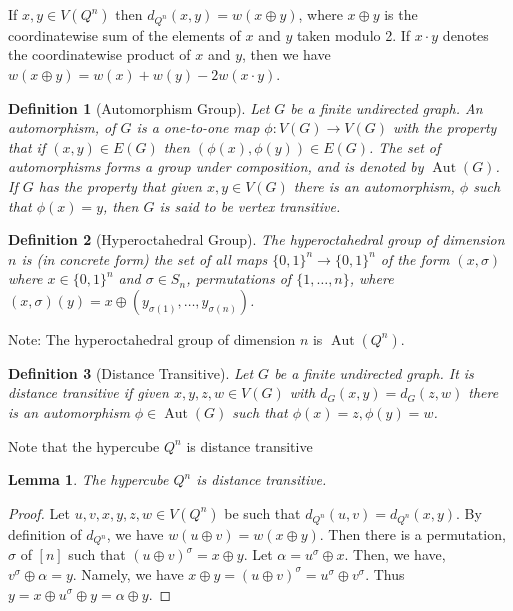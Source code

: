 \documentclass{article}
\DeclareMathOperator{\Aut}{Aut} \newcommand{\RR}{\mathbb{R}}
\newtheorem{definition}{Definition}
\newtheorem{lemma}{Lemma}
\begin{document}
If $x,y \in V(Q^n)$ then $d_{Q^n}(x,y) = w(x \oplus y)$, where $x
\oplus y$ is the coordinatewise sum of the elements of $x$ and $y$
taken modulo 2.  If $x \cdot y$ denotes the coordinatewise product of $x$
and $y$, then we have $w(x \oplus y) = w(x) + w(y) - 2 w(x \cdot y)$.

\begin{definition}[Automorphism Group]
  Let $G$ be a finite undirected graph.  An \emph{automorphism}, of
  $G$ is a one-to-one map $\phi: V(G) \rightarrow V(G)$ with the
  property that if $(x,y) \in E(G)$ then
  $(\phi(x), \phi(y)) \in E(G)$.  The set of automorphisms forms a
  group under composition, and is denoted by $\Aut(G)$.  If $G$ has
  the property that given $x, y \in V(G)$ there is an automorphism,
  $\phi$ such that $\phi(x) = y$, then $G$ is said to be \emph{vertex
    transitive}.
\end{definition}

\begin{definition}[Hyperoctahedral Group]
The \emph{hyperoctahedral group} of dimension $n$ is (in concrete
form) the set of all maps $\{0,1\}^n \rightarrow \{0,1\}^n$ of the
form $(x,\sigma)$ where $x \in \{0,1\}^n$ and $\sigma \in S_n$,
permutations of $\{1, \dots, n\}$, where $(x, \sigma) (y) = x \oplus
(y_{\sigma(1)}, \dots, y_{\sigma(n)})$.
  
\end{definition}
Note: The hyperoctahedral group of dimension $n$ is $\Aut(Q^n)$.

\begin{definition}[Distance Transitive]
Let $G$ be a finite undirected graph.  It is \emph{distance
  transitive} if given $x,y,z,w \in V(G)$ with $d_G(x,y) = d_G(z,w)$
there is an automorphism $\phi \in \Aut(G)$ such that $\phi(x) = z, \phi(y) = w$.
  
\end{definition}
Note that the hypercube $Q^n$ is distance transitive

\begin{lemma}
  The hypercube $Q^n$ is distance transitive.
\end{lemma}
\begin{proof}
  Let $u,v,x,y,z,w \in V(Q^n)$ be such that $d_{Q^n}(u,v) = d_{Q^n}(x,y)$.
  By definition of $d_{Q^n}$, we have $w(u \oplus v) = w(x \oplus y)$.
  Then there is a permutation, $\sigma$ of $[n]$ such that
  $(u \oplus v)^\sigma = x \oplus y$.  Let $\alpha = u^\sigma \oplus
  x$.  Then, we have, $v^\sigma \oplus \alpha = y$.  Namely, we have
  $x \oplus y = (u \oplus v)^\sigma = u^\sigma \oplus v^\sigma$.  Thus
  $y = x \oplus u^\sigma \oplus y = \alpha \oplus y$.
\end{proof}
\end{document}
